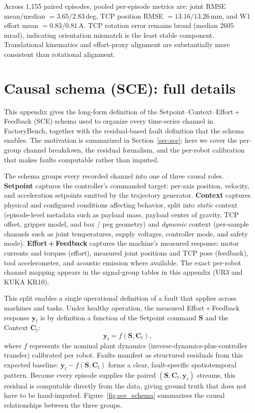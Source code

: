 \documentclass{article}
\begin{document}
Across 1{,}155 paired episodes, pooled per-episode metrics are: joint RMSE mean/median $=3.65/2.83$\,deg, TCP position RMSE $=13.16/13.26$\,mm, and W1 effort mean $=0.83/0.81$\,A. TCP rotation error remains broad (median $2605$\,mrad), indicating orientation mismatch is the least stable component. Translational kinematics and effort-proxy alignment are substantially more consistent than rotational alignment.


\section{Causal schema (SCE): full details}
\label{app:sce}

This appendix gives the long-form definition of the Setpoint--Context--Effort\,+\,Feedback (SCE) schema used to organize every time-series channel in FactoryBench, together with the residual-based fault definition that the schema enables. The motivation is summarized in Section~\ref{sec:sce}; here we cover the per-group channel breakdown, the residual formalism, and the per-robot calibration that makes faults computable rather than imputed.

The schema groups every recorded channel into one of three causal roles. \textbf{Setpoint} captures the controller's commanded target: per-axis position, velocity, and acceleration setpoints emitted by the trajectory generator. \textbf{Context} captures physical and configured conditions affecting behavior, split into \emph{static} context (episode-level metadata such as payload mass, payload center of gravity, TCP offset, gripper model, and box / peg geometry) and \emph{dynamic} context (per-sample channels such as joint temperatures, supply voltages, controller mode, and safety mode). \textbf{Effort\,+\,Feedback} captures the machine's measured response: motor currents and torques (effort), measured joint positions and TCP pose (feedback), tool accelerometer, and acoustic emission where available. The exact per-robot channel mapping appears in the signal-group tables in this appendix (UR3 and KUKA KR10).

This split enables a single operational definition of a fault that applies across machines and tasks. Under healthy operation, the measured Effort\,+\,Feedback response $\mathbf{y}_t$ is by definition a function of the Setpoint command $\mathbf{S}$ and the Context $\mathbf{C}_t$:
$$\mathbf{y}_t = f(\mathbf{S}, \mathbf{C}_t),$$
where $f$ represents the nominal plant dynamics (inverse-dynamics-plus-controller transfer) calibrated per robot. Faults manifest as structured residuals from this expected baseline: $\mathbf{y}_t - f(\mathbf{S}, \mathbf{C}_t)$ forms a clear, fault-specific spatiotemporal pattern. Because every episode supplies the paired $(\mathbf{S}, \mathbf{C}_t, \mathbf{y}_t)$ streams, this residual is computable directly from the data, giving ground truth that does not have to be hand-imputed. Figure~\ref{fig:sce_schema} summarises the causal relationships between the three groups.
\end{document}
